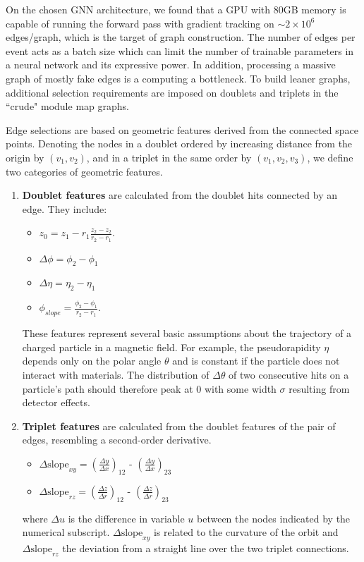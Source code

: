 On the chosen GNN architecture, we found that a GPU with 80GB memory is capable of running the forward pass with gradient tracking on $\sim 2\times 10^6$ edges/graph, which is the target of graph construction. 
The number of edges per event acts as a batch size which can limit the number of trainable parameters in a neural network and its expressive power.
In addition, processing a massive graph of mostly fake edges is a computing a bottleneck. 
To build leaner graphs, additional selection requirements are imposed on doublets and triplets in the ``crude" module map graphs.

Edge selections are based on geometric features derived from the connected space points. 
Denoting the nodes in a doublet ordered by increasing distance from the origin by $(v_1, v_2)$, and in a triplet in the same order by $(v_1, v_2, v_3)$, we define two categories of geometric features.
\begin{enumerate}
    \item \textbf{Doublet features} are calculated from the doublet hits connected by an edge. They include:
    \begin{itemize}
        \item $z_0 = z_1-r_1\frac{z_2-z_2}{r_2-r_1}$.
        \item $\Delta\phi=\phi_2-\phi_1$
        \item $\Delta\eta = \eta_2-\eta_1$
        \item $\phi_{slope}=\frac{\phi_2-\phi_1}{r_2-r_1}$.
    \end{itemize}
    These features represent several basic assumptions about the trajectory of a charged particle in a magnetic field. 
    For example, the pseudorapidity $\eta$ depends only on the polar angle $\theta$ and is constant if the particle does not interact with materials. 
    The distribution of $\Delta \theta$ of two consecutive hits on a particle's path should therefore peak at $0$ with some width $\sigma$ resulting from detector effects. 
    \item \textbf{Triplet features} are calculated from the doublet features of the pair of edges, resembling a second-order derivative. 
    \begin{itemize}
        \item $\Delta\mathrm{slope}_{xy} = \left(\frac{\Delta y}{\Delta x}\right)_{12}$ - $\left(\frac{\Delta y}{\Delta x}\right)_{23}$
        \item $\Delta\mathrm{slope}_{rz} = \left(\frac{\Delta z}{\Delta r}\right)_{12}$ - $\left(\frac{\Delta z}{\Delta r}\right)_{23}$
    \end{itemize}
    where $\Delta u$ is the difference in variable $u$ between the nodes indicated by the numerical subscript. $\Delta\mathrm{slope}_{xy}$ is related to the curvature of the orbit and $\Delta\mathrm{slope}_{rz}$ the deviation from a straight line over the two triplet connections.
\end{enumerate}
